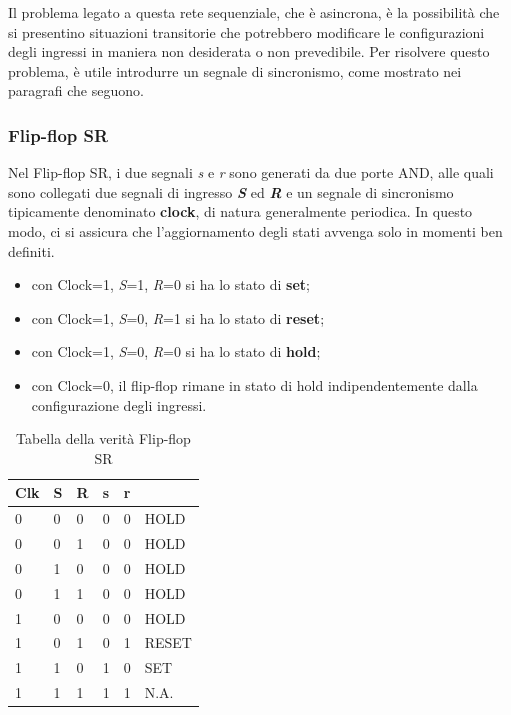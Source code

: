\documentclass[10pt]{article}
\begin{document}
\begin{itemize}
Il problema legato a questa rete sequenziale, che è asincrona, è la possibilità che si presentino situazioni transitorie che potrebbero modificare le configurazioni degli ingressi in maniera non desiderata o 
non prevedibile. Per risolvere questo problema, è utile introdurre un segnale di sincronismo, come mostrato nei paragrafi che seguono.

\subsubsection{Flip-flop SR}
Nel Flip-flop SR, i due segnali \emph{s} e \emph{r} sono generati da due porte AND, alle quali sono collegati due segnali di ingresso \textbf{\emph{S}} ed \textbf{\emph{R}} 
e un segnale di sincronismo tipicamente denominato \textbf{clock}, di natura generalmente periodica. 
In questo modo, ci si assicura che l'aggiornamento degli stati avvenga solo in momenti ben definiti.
\begin{itemize}
    \item con Clock=1, \emph{S}=1, \emph{R}=0 si ha lo stato di \textbf{set};
    \item con Clock=1, \emph{S}=0, \emph{R}=1 si ha lo stato di \textbf{reset};
    \item con Clock=1, \emph{S}=0, \emph{R}=0 si ha lo stato di \textbf{hold};
    \item con Clock=0, il flip-flop rimane in stato di hold indipendentemente dalla configurazione degli ingressi.
\end{itemize}

\begin{table}[H]
    \begin{minipage}[b]{0.4\textwidth}
    \centering
    \begin{tabular}{|lll|ll|l|}
        \hline
        \textbf{Clk} & \textbf{S} & \textbf{R} & \textbf{s} & \textbf{r} &       \\ \hline
        0            & 0          & 0          & 0          & 0          & HOLD  \\ 
        0            & 0          & 1          & 0          & 0          & HOLD  \\ 
        0            & 1          & 0          & 0          & 0          & HOLD  \\ 
        0            & 1          & 1          & 0          & 0          & HOLD  \\ 
        1            & 0          & 0          & 0          & 0          & HOLD  \\ 
        1            & 0          & 1          & 0          & 1          & RESET \\ 
        1            & 1          & 0          & 1          & 0          & SET   \\ 
        1            & 1          & 1          & 1          & 1          & N.A.  \\ \hline
        \end{tabular}
        \caption{Tabella della verità Flip-flop SR}
        \label{tab:my-table}
    \end{minipage}
    \end{table}
    

\end{itemize}
\end{document}
